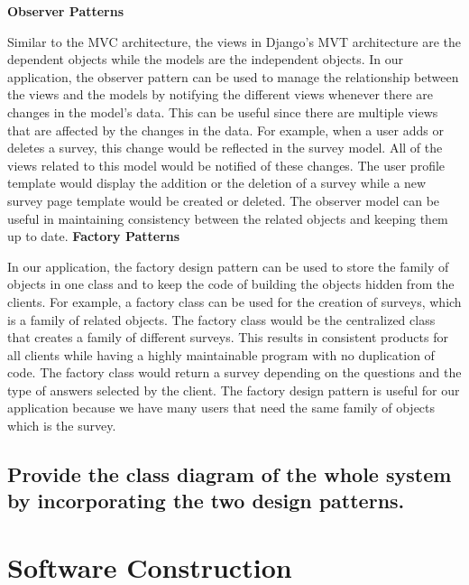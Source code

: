 \documentclass[letterpaper, 12 pt, conference]{ieeeconf}
\begin{document}
\textbf{Observer Patterns}

Similar to the MVC architecture, the views in Django’s MVT architecture are the dependent objects while the models are the independent objects. In our application, the observer pattern can be used to manage the relationship between the views and the models by notifying the different views whenever there are changes in the model’s data. This can be useful since there are multiple views that are affected by the changes in the data. For example, when a user adds or deletes a survey, this change would be reflected in the survey model. All of the views related to this model would be notified of these changes. The user profile template would display the addition or the deletion of a survey while a new survey page template would be created or deleted. The observer model can be useful in maintaining consistency between the related objects and keeping them up to date. 
\newline
\hfill \break
\textbf{Factory Patterns}

In our application, the factory design pattern can be used to store the family of objects in one class and to keep the code of building the objects hidden from the clients. For example, a factory class can be used for the creation of surveys, which is a family of related objects. The factory class would be the centralized class that creates a family of different surveys. This results in consistent products for all clients while having a highly maintainable program with no duplication of code. The factory class would return a survey depending on the questions and the type of answers selected by the client. The factory design pattern is useful for our application because we have many users that need the same family of objects which is the survey.


\linebreak
    \hfill \break
    
\newpage
\subsection{Provide the class diagram of the whole system by incorporating the two design patterns.}
\linebreak
    \hfill \break
\newpage


\section{Software Construction}
\end{document}
